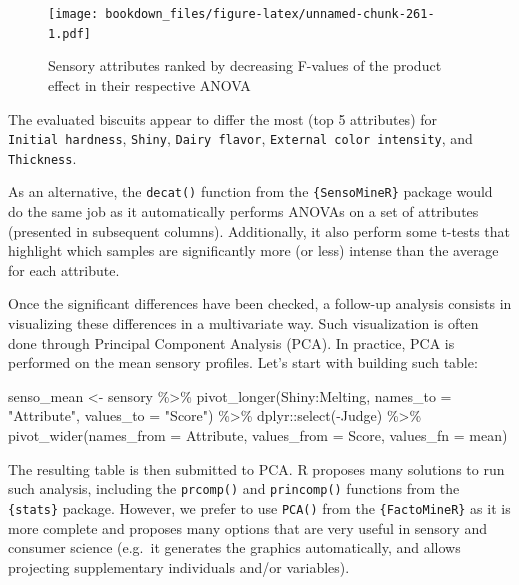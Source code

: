 \documentclass[
]{krantz}
\makeatletter
\newenvironment{Shaded}{\begin{snugshade}}{\end{snugshade}}
\newcommand{\AttributeTok}[1]{\textcolor[rgb]{0.61,0.61,0.61}{#1}}
\newcommand{\FunctionTok}[1]{\textcolor[rgb]{0,0,0}{#1}}
\newcommand{\NormalTok}[1]{#1}
\newcommand{\OtherTok}[1]{\textcolor[rgb]{0.37,0.37,0.37}{#1}}
\newcommand{\SpecialCharTok}[1]{\textcolor[rgb]{0,0,0}{#1}}
\newcommand{\StringTok}[1]{\textcolor[rgb]{0.5,0.5,0.5}{#1}}
\renewenvironment{quote}{\begin{VF}}{\end{VF}}
\newenvironment{kframe}{%
\medskip{}
\setlength{\fboxsep}{.8em}
 \def\at@end@of@kframe{}%
 \ifinner\ifhmode%
  \def\at@end@of@kframe{\end{minipage}}%
  \begin{minipage}{\columnwidth}%
 \fi\fi%
 \def\FrameCommand##1{\hskip\@totalleftmargin \hskip-\fboxsep
 \colorbox{shadecolor}{##1}\hskip-\fboxsep
     \hskip-\linewidth \hskip-\@totalleftmargin \hskip\columnwidth}%
 \MakeFramed {\advance\hsize-\width
   \@totalleftmargin\z@ \linewidth\hsize
   \@setminipage}}%
 {\par\unskip\endMakeFramed%
 \at@end@of@kframe}
\renewenvironment{Shaded}{\begin{kframe}}{\end{kframe}}
\makeatother
\begin{document}
\begin{figure}
\centering
\texttt{[image: bookdown\_files/figure-latex/unnamed-chunk-261-1.pdf]}
\caption{\label{fig:unnamed-chunk-261}Sensory attributes ranked by decreasing F-values of the product effect in their respective ANOVA}
\end{figure}

The evaluated biscuits appear to differ the most (top 5 attributes) for \texttt{Initial\ hardness}, \texttt{Shiny}, \texttt{Dairy\ flavor}, \texttt{External\ color\ intensity}, and \texttt{Thickness}.

\begin{quote}
As an alternative, the \texttt{decat()} function from the \texttt{\{SensoMineR\}} package would do the same job as it automatically performs ANOVAs on a set of attributes (presented in subsequent columns). Additionally, it also perform some t-tests that highlight which samples are significantly more (or less) intense than the average for each attribute.
\end{quote}

Once the significant differences have been checked, a follow-up analysis consists in visualizing these differences in a multivariate way. Such visualization is often done through Principal Component Analysis (PCA). In practice, PCA is performed on the mean sensory profiles. Let's start with building such table:

\begin{Shaded}
\begin{Highlighting}[]
\NormalTok{senso\_mean }\OtherTok{\textless{}{-}}\NormalTok{ sensory }\SpecialCharTok{\%\textgreater{}\%}
  \FunctionTok{pivot\_longer}\NormalTok{(Shiny}\SpecialCharTok{:}\NormalTok{Melting, }
               \AttributeTok{names\_to =} \StringTok{"Attribute"}\NormalTok{, }\AttributeTok{values\_to =} \StringTok{"Score"}\NormalTok{) }\SpecialCharTok{\%\textgreater{}\%}
\NormalTok{  dplyr}\SpecialCharTok{::}\FunctionTok{select}\NormalTok{(}\SpecialCharTok{{-}}\NormalTok{Judge) }\SpecialCharTok{\%\textgreater{}\%}
  \FunctionTok{pivot\_wider}\NormalTok{(}\AttributeTok{names\_from =}\NormalTok{ Attribute, }\AttributeTok{values\_from =}\NormalTok{ Score, }
              \AttributeTok{values\_fn =}\NormalTok{ mean)}
\end{Highlighting}
\end{Shaded}

The resulting table is then submitted to PCA. R proposes many solutions to run such analysis, including the \texttt{prcomp()} and \texttt{princomp()} functions from the \texttt{\{stats\}} package. However, we prefer to use \texttt{PCA()} from the \texttt{\{FactoMineR\}} as it is more complete and proposes many options that are very useful in sensory and consumer science (e.g.~it generates the graphics automatically, and allows projecting supplementary individuals and/or variables).
\end{document}
